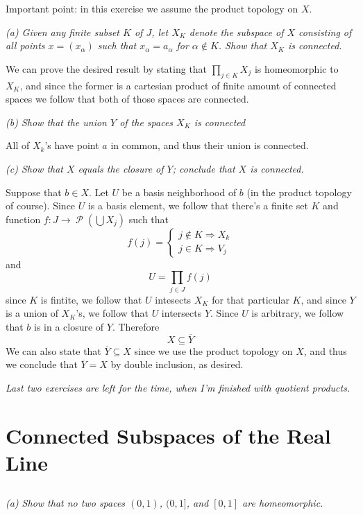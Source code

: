 \documentclass[11pt,oneside,titlepage]{book}
\DeclareMathOperator \pow {\mathcal {P}}
\DeclareMathOperator \ra {\Rightarrow}
\begin{document}
Important point: in this exercise we assume the product topology on $X$.

\textit{(a) Given any finite subset $K$ of $J$, let $X_K$ denote the subspace of $X$ consisting
  of all points $x = (x_\alpha)$ such that $x_\alpha = a_\alpha$ for $\alpha \notin K$. Show that
  $X_K$ is connected.}

We can prove the desired result by stating that $\prod_{j \in K}{X_j}$ is homeomorphic
to $X_K$, and since the former is a cartesian product of finite amount of connected spaces
we follow that both of those spaces are connected.

\textit{(b) Show that the union $Y$ of the spaces $X_K$ is connected}

All of $X_k$'s have point $a$ in common, and thus their union is connected.

\textit{(c) Show that $X$ equals the closure of $Y$; conclude that $X$ is connected.}

Suppose that $b \in X$. Let $U$ be a basis neighborhood of $b$ (in the product topology of course).
Since $U$ is a basis element, we follow that there's a finite set $K$ and function
$f: J \to \pow(\bigcup{X_j})$ such that
$$f(j) =
\begin{cases}
  j \notin K \ra X_k \\
  j \in K \ra V_j
\end{cases}
$$
and 
$$U = \prod_{j \in J}{f(j)}$$
since $K$ is fintite, we follow that $U$ intesects $X_K$ for that particular $K$, and
since $Y$ is a union of $X_K$'s, we follow that $U$ intersects $Y$. Since $U$
is arbitrary, we follow that $b$ is in a closure of $Y$. Therefore
$$X \subseteq \overline{Y}$$
We can also state that $\overline{Y} \subseteq X$ since we use the product topology on $X$,
and thus we conclude that $\overline{Y} = X$ by double inclusion, as desired.

\textit{Last two exercises are left for the time, when I'm finished with quotient products.}

\section{Connected Subspaces of the Real Line}

\subsection{}

\textit{(a) Show that no two spaces $(0, 1)$, $(0, 1]$, and $[0, 1]$ are homeomorphic.}
\end{document}
